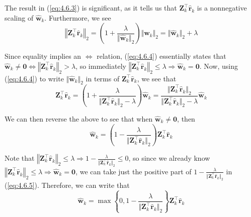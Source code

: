 \documentclass{article}
\numberwithin{equation}{section}
\begin{document}
The result in (\ref{eq:4.6.3}) is significant, as it tells us that
$ \mathbf{Z}_k^\top\hat{\mathbf{r}}_k $ is a nonnegative scaling of
$ \hat{\mathbf{w}}_k $. Furthermore, we see
\begin{equation} \label{eq:4.6.4}
    \left\Vert\mathbf{Z}_k^\top\hat{\mathbf{r}}_k\right\Vert_2 =
    \left(1 + \frac{\lambda}{\Vert\hat{\mathbf{w}}_k\Vert_2}\right)
    \Vert\hat{\mathbf{w}}_k\Vert_2 =
    \Vert\hat{\mathbf{w}}_k\Vert_2 + \lambda
\end{equation}

Since equality implies an $ \Leftrightarrow $ relation, (\ref{eq:4.6.4})
essentially states that $ \hat{\mathbf{w}}_k \ne \mathbf{0} \Leftrightarrow
\left\Vert\mathbf{Z}_k^\top\hat{\mathbf{r}}_k\right\Vert_2 > \lambda $, so
immediately $ \left\Vert\mathbf{Z}_k^\top\hat{\mathbf{r}}_k\right\Vert_2 \le
\lambda \Rightarrow \hat{\mathbf{w}}_k = \mathbf{0} $. Now, using
(\ref{eq:4.6.4}) to write $ \Vert\hat{\mathbf{w}}_k\Vert_2 $ in terms of
$ \mathbf{Z}_k^\top\hat{\mathbf{r}}_k $, we see that
\begin{equation*}
    \mathbf{Z}_k^\top\hat{\mathbf{r}}_k =
    \left(
        1 +
        \frac{
            \lambda
        }{
            \Vert\mathbf{Z}_k^\top\hat{\mathbf{r}}_k\Vert_2 - \lambda
        }
    \right)
    \hat{\mathbf{w}}_k =
    \frac{
        \Vert\mathbf{Z}_k^\top\hat{\mathbf{r}}_k\Vert_2
    }{
        \Vert\mathbf{Z}_k^\top\hat{\mathbf{r}}_k\Vert_2 - \lambda
    }
    \hat{\mathbf{w}}_k
\end{equation*}

We can then reverse the above to see that when
$ \hat{\mathbf{w}}_k \ne \mathbf{0} $, then
\begin{equation} \label{eq:4.6.5}
    \hat{\mathbf{w}}_k =
    \left(
        1 - \frac{\lambda}{\Vert\mathbf{Z}_k^\top\hat{\mathbf{r}}_k\Vert_2}
    \right)
    \mathbf{Z}_k^\top\hat{\mathbf{r}}_k
\end{equation}

Note that $ \left\Vert\mathbf{Z}_k^\top\hat{\mathbf{r}}_k\right\Vert_2 \le
\lambda \Rightarrow 1 - \frac{
    \lambda
}{
    \Vert\mathbf{Z}_k^\top\hat{\mathbf{r}}_k\Vert_2
}
\le 0 $, so since we already know
$ \left\Vert\mathbf{Z}_k^\top\hat{\mathbf{r}}_k\right\Vert_2 \le \lambda
\Rightarrow \hat{\mathbf{w}}_k = \mathbf{0} $, we can take just the positive
part of $ 1 - \frac{\lambda}{\Vert\mathbf{Z}_k^\top\hat{\mathbf{r}}_k\Vert_2} $
in (\ref{eq:4.6.5}). Therefore, we can write that
\begin{equation} \label{eq:4.6.6}
    \hat{\mathbf{w}}_k =
    \max\left\{
        0, 1 - \frac{\lambda}{\Vert\mathbf{Z}_k^\top\hat{\mathbf{r}}_k\Vert_2}
    \right\}
    \mathbf{Z}_k^\top\hat{\mathbf{r}}_k
\end{equation}
\end{document}
